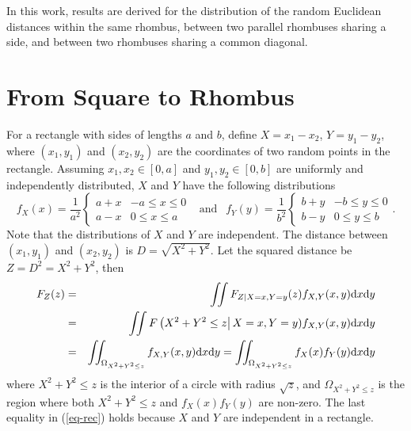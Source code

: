 \documentclass[12pt,draftclsnofoot,onecolumn]{IEEEtran}
\begin{document}
In this work, results are derived for the distribution of
the random Euclidean distances within the same rhombus, between two parallel rhombuses
sharing a side, and between two rhombuses sharing a common diagonal.

\section{From Square to Rhombus}
For a rectangle with sides of lengths $a$ and $b$, define $X=x_1-x_2$,
$Y=y_1-y_2$, where $(x_1, y_1)$ and $(x_2, y_2)$ are the coordinates of two
random points in the rectangle. Assuming $x_1, x_2 \in [0,a]$ and $y_1, y_2 \in
[0, b]$ are uniformly and independently distributed, $X$ and $Y$ have the following
distributions
\begin{equation}\label{eq:fxy}
  f_X(x)=\frac{1}{a^2}\left\{
    \begin{array}{lr}
      a+x & -a\leq x \leq 0 \\
      a-x & 0 \leq x \leq a
    \end{array}
  \right.
  ~~\mbox{ and }~~ f_Y(y)=\frac{1}{b^2}\left\{
    \begin{array}{lr}
      b+y & -b\leq y \leq 0 \\
      b-y & 0 \leq y \leq b
    \end{array}
  \right..
\end{equation}
%
Note that the distributions of $X$ and $Y$ are independent. The
distance between $(x_1, y_1)$ and $(x_2, y_2)$ is $D=\sqrt{X^2+Y^2}$. Let the
squared distance be $Z=D^2=X^2+Y^2$, then
\begin{eqnarray}\label{eq-rec}
F_Z(z)&=&\iint F_{Z|X=x, Y=y}(z)f_{X,Y}(x,y){\rm d}x{\rm d}y\nonumber\\
&=&\iint F\left(X^2+Y^2 \leq z\right|X=x, Y=y)f_{X,Y}(x,y){\rm d}x{\rm
d}y\nonumber\\
&=&\iint_{\Omega_{X^2+Y^2 \leq z}}f_{X,Y}(x,y){\rm d}x{\rm d}y=
\iint_{\Omega_{X^2+Y^2 \leq z}}f_X(x)f_Y(y){\rm d}x{\rm d}y
\end{eqnarray}
where $X^2+Y^2 \leq z$ is the interior of a circle with radius $\sqrt{z}$, and
$\Omega_{X^2+Y^2 \leq z}$ is the region where both $X^2+Y^2 \leq z$ and
$f_X(x)f_Y(y)$ are non-zero. The last equality in (\ref{eq-rec}) holds because
$X$ and $Y$ are independent in a rectangle.
\end{document}

